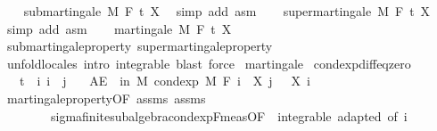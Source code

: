 \begin{isabellebody}
\ \ \isamarkupfalse%
\ submartingale\ M\ F\ t\ X\ \isamarkupfalse%
\ {\isacharparenleft}{\kern0pt}simp\ add{\isacharcolon}{\kern0pt}\ asm{\isacharparenright}{\kern0pt}\isanewline
\ \ \isamarkupfalse%
\ supermartingale\ M\ F\ t\ X\ \isamarkupfalse%
\ {\isacharparenleft}{\kern0pt}simp\ add{\isacharcolon}{\kern0pt}\ asm{\isacharparenright}{\kern0pt}\isanewline
\ \ \isamarkupfalse%
\ {\isachardoublequoteopen}martingale\ M\ F\ t\ X{\isachardoublequoteclose}\ \isamarkupfalse%
\ submartingale{\isacharunderscore}{\kern0pt}property\ supermartingale{\isacharunderscore}{\kern0pt}property\ \isamarkupfalse%
\ {\isacharparenleft}{\kern0pt}unfold{\isacharunderscore}{\kern0pt}locales{\isacharparenright}{\kern0pt}\ {\isacharparenleft}{\kern0pt}intro\ integrable{\isacharcomma}{\kern0pt}\ blast{\isacharcomma}{\kern0pt}\ force{\isacharparenright}{\kern0pt}\isanewline
{}\isamarkupfalse%
%
\endisatagproof
{\isafoldproof}%
%
\isadelimproof
%
\endisadelimproof
%
\isadelimdocument
%
\endisadelimdocument
%
\isatagdocument
%
\isamarkuptrue%
%
\endisatagdocument
{\isafolddocument}%
%
\isadelimdocument
%
\endisadelimdocument
{}\isamarkupfalse%
\ martingale\isanewline
{}\isanewline
\isanewline
{}\isamarkupfalse%
\ cond{\isacharunderscore}{\kern0pt}exp{\isacharunderscore}{\kern0pt}diff{\isacharunderscore}{\kern0pt}eq{\isacharunderscore}{\kern0pt}zero{\isacharcolon}{\kern0pt}\isanewline
\ \ \ {\isachardoublequoteopen}t\ {\isasymle}\ i{\isachardoublequoteclose}\ {\isachardoublequoteopen}i\ {\isasymle}\ j{\isachardoublequoteclose}\isanewline
\ \ \ {\isachardoublequoteopen}AE\ {\isasymxi}\ in\ M{\isachardot}{\kern0pt}\ cond{\isacharunderscore}{\kern0pt}exp\ M\ {\isacharparenleft}{\kern0pt}F\ i{\isacharparenright}{\kern0pt}\ {\isacharparenleft}{\kern0pt}{\isasymlambda}{\isasymxi}{\isachardot}{\kern0pt}\ X\ j\ {\isasymxi}\ {\isacharminus}{\kern0pt}\ X\ i\ {\isasymxi}{\isacharparenright}{\kern0pt}\ {\isasymxi}\ {\isacharequal}{\kern0pt}\ {}{\isachardoublequoteclose}\isanewline
%
\isadelimproof
\ \ %
\endisadelimproof
%
\isatagproof
{}\isamarkupfalse%
\ martingale{\isacharunderscore}{\kern0pt}property{\isacharbrackleft}{\kern0pt}OF\ assms{\isacharbrackright}{\kern0pt}\ assms\isanewline
\ \ \ \ \ \ \ \ sigma{\isacharunderscore}{\kern0pt}finite{\isacharunderscore}{\kern0pt}subalgebra{\isachardot}{\kern0pt}cond{\isacharunderscore}{\kern0pt}exp{\isacharunderscore}{\kern0pt}F{\isacharunderscore}{\kern0pt}meas{\isacharbrackleft}{\kern0pt}OF\ {\isacharunderscore}{\kern0pt}\ integrable\ adapted{\isacharcomma}{\kern0pt}\ of\ i{\isacharbrackright}{\kern0pt}\isanewline

\end{isabellebody}

